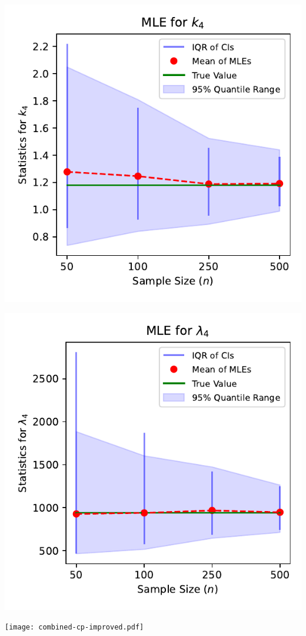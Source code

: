 \documentclass{article}
\begin{document}
\vspace{0.25mm}

\noindent
\begin{minipage}[t]{0.45\textwidth}
  \centering
  \includegraphics[width=\textwidth,height=0.33\textheight,keepaspectratio]{plot-n-vs-shape.4.pdf}
\end{minipage}%
\hspace{0.05\textwidth} %
\begin{minipage}[t]{0.45\textwidth}
  \centering
  \includegraphics[width=\textwidth,height=0.33\textheight,keepaspectratio]{plot-n-vs-scale.4.pdf}
\end{minipage}

\vspace{0.25mm}

\begin{center}
  \texttt{[image: combined-cp-improved.pdf]}
\end{center}
\end{document}
